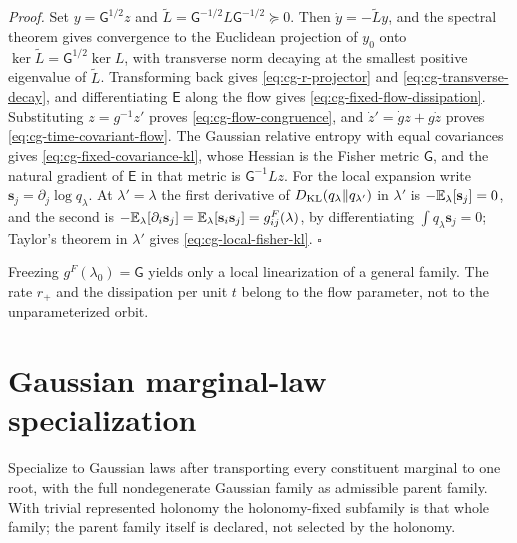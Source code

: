 \noindent\emph{Proof.}
Set \(y=\mathsf G^{1/2}z\) and \(\widetilde L=\mathsf G^{-1/2}L\mathsf G^{-1/2}\succeq0\).
Then \(\dot y=-\widetilde Ly\), and the spectral theorem gives convergence to the
Euclidean projection of \(y_0\) onto \(\ker\widetilde L=\mathsf G^{1/2}\ker L\), with
transverse norm decaying at the smallest positive eigenvalue of \(\widetilde L\).
Transforming back gives \eqref{eq:cg-r-projector} and
\eqref{eq:cg-transverse-decay}, and differentiating \(\mathsf E\) along the
flow gives \eqref{eq:cg-fixed-flow-dissipation}. Substituting \(z=g^{-1}z'\)
proves \eqref{eq:cg-flow-congruence}, and \(\dot z'=\dot gz+g\dot z\) proves
\eqref{eq:cg-time-covariant-flow}. The Gaussian relative entropy with equal
covariances gives \eqref{eq:cg-fixed-covariance-kl}, whose Hessian is the Fisher
metric \(\mathsf G\), and the natural gradient of \(\mathsf E\) in that metric
is \(\mathsf G^{-1}Lz\). For the local expansion write
\(\mathbf s_j=\partial_j\log q_\lambda\). At \(\lambda'=\lambda\) the first derivative
of \(D_{\mathrm{KL}}(q_\lambda\Vert q_{\lambda'})\) in \(\lambda'\) is
\(-\mathbb E_\lambda[\mathbf s_j]=0\), and the second is
\(-\mathbb E_\lambda[\partial_i\mathbf s_j]=\mathbb E_\lambda[\mathbf s_i\mathbf s_j]=g^F_{ij}(\lambda)\), by
differentiating \(\int q_\lambda\mathbf s_j=0\); Taylor's theorem in \(\lambda'\)
gives \eqref{eq:cg-local-fisher-kl}. \(\square\)

Freezing \(g^F(\lambda_0)=\mathsf G\) yields only a local linearization of a
general family. The rate \(r_+\) and the dissipation per unit \(t\) belong to
the flow parameter, not to the unparameterized orbit.

\section{Gaussian marginal-law specialization}
\label{sec:cg-gaussian-marginal-law}

Specialize  to Gaussian laws after
transporting every constituent marginal to one root, with the full nondegenerate
Gaussian family as admissible parent family. With trivial represented holonomy
the holonomy-fixed subfamily is that whole family; the parent family itself is
declared, not selected by the holonomy.

